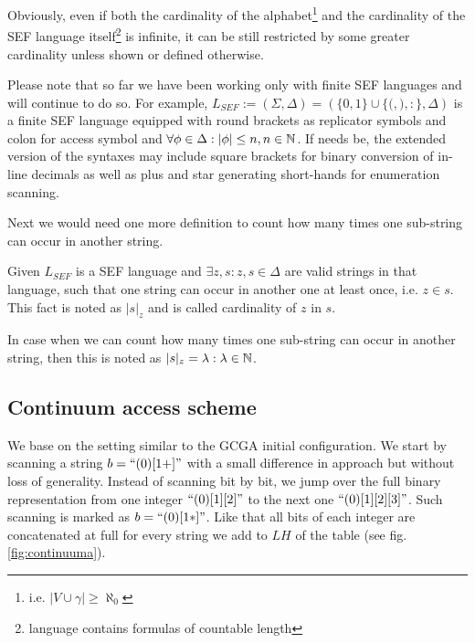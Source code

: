 Obviously, even if both the cardinality of the alphabet\footnote{i.e. $| V \cup \gamma| \geq \aleph_{0}$} and the cardinality of the SEF language itself\footnote{language contains formulas of countable length} is infinite, it can be still restricted by some greater cardinality unless shown or defined otherwise.

Please note that so far we have been working only with finite SEF languages and will continue to do so. For example, $L_{SEF} := (\Sigma, \Delta) = (\{0,1\} \cup \{{(}, {)}, {:}\}, \Delta)$ is a finite SEF language equipped with round brackets as replicator symbols and colon for access symbol and $\forall \phi \in \Delta: |\phi| \leq n, n \in \mathbb{N}$. If needs be, the extended version of the syntaxes may include square brackets for binary conversion of in-line decimals as well as plus and star generating short-hands for enumeration scanning.

Next we would need one more definition to count how many times one sub-string can occur in another string.

\begin{definition}Given $L_{SEF}$ is a SEF language and $\exists z,s: z,s \in \Delta$ are valid strings in that language, such that one string can occur in another one at least once, i.e. $z \in s$. This fact is noted as $|s|_{z}$ and is called cardinality of $z$ in $s$.\end{definition}

In case when we can count how many times one sub-string can occur in another string, then this is noted as $|s|_{z} = \lambda: \lambda \in \mathbb{N}$.

\subsection{Continuum access scheme}\label{subsec_cas}

We base on the setting similar to the GCGA initial configuration. We start by scanning a string $b=\text{``}(0)[1+]\text{''}$ with a small difference in approach but without loss of generality. Instead of scanning bit by bit, we jump over the full binary representation from one integer $\text{``}(0)[1][2]\text{''}$ to the next one $\text{``}(0)[1][2][3]\text{''}$. Such scanning is marked as $b=\text{``}(0)[1*]\text{''}$. Like that all bits of each integer are concatenated at full for every string we add to $LH$ of the table (see fig. \ref{fig:continuuma}).

